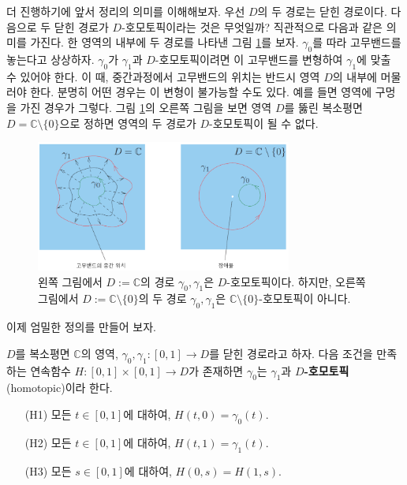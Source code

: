 더 진행하기에 앞서 정리의 의미를 이해해보자.
우선 $D$의 두 경로는 닫힌 경로이다.
다음으로 두 닫힌 경로가 $D$-호모토픽이라는 것은 무엇일까?
직관적으로 다음과 같은 의미를 가진다.
한 영역의 내부에 두 경로를 나타낸 그림 \ref{fig-3-12}를 보자.
$\gamma_0$를 따라 고무밴드를 놓는다고 상상하자.
$\gamma_0$가 $\gamma_1$과 $D$-호모토픽이려면
이 고무밴드를 변형하여 $\gamma_1$에 맞출 수 있어야 한다.
이 때, 중간과정에서 고무밴드의 위치는 반드시 영역 $D$의 내부에 머물러야 한다.
분명히 어떤 경우는 이 변형이 불가능할 수도 있다. 
예를 들면 영역에 구멍을 가진 경우가 그렇다.
그림 \ref{fig-3-12}의 오른쪽 그림을 보면 
영역 $D$를 뚫린 복소평면 $D=\mathbb C\setminus \{0\}$으로 정하면
영역의 두 경로가 $D$-호모토픽이 될 수 없다.

\begin{figure}[!h]
\begin{center}
\includegraphics[width=0.75\textwidth]{./SaltChapter/figs/fig-3-12-kr}
\end{center}
\caption{왼쪽 그림에서 $D:=\mathbb C$의 경로 $\gamma_0, \gamma_1$은 $D$-호모토픽이다.
하지만, 오른쪽 그림에서 $D:=\mathbb C\setminus\{0\}$의 두 경로
$\gamma_0, \gamma_1$은 $\mathbb C\setminus\{0\}$-호모토픽이 아니다.}
\label{fig-3-12}
\end{figure}

이제 엄밀한 정의를 만들어 보자.

\begin{saltdefinition}{}{} \label{def-3-3}
$D$를 복소평면 $\mathbb C$의 영역,
$\gamma_0, \gamma_1 : [0,1] \to D$를 닫힌 경로라고 하자.
다음 조건을 만족하는 연속함수 $H:[0,1]\times[0,1]\to D$가 존재하면
$\gamma_0$는 $\gamma_1$과 {\bf $D$-호모토픽}(homotopic)이라 한다.
\begin{itemize}
\item[(H1)] 모든 $t\in [0,1]$에 대하여, $H(t,0)=\gamma_0(t)$.
\item[(H2)] 모든 $t\in [0,1]$에 대하여, $H(t,1)=\gamma_1(t)$.
\item[(H3)] 모든 $s\in [0,1]$에 대하여, $H(0,s)=H(1,s)$.
\end{itemize}
\end{saltdefinition}

